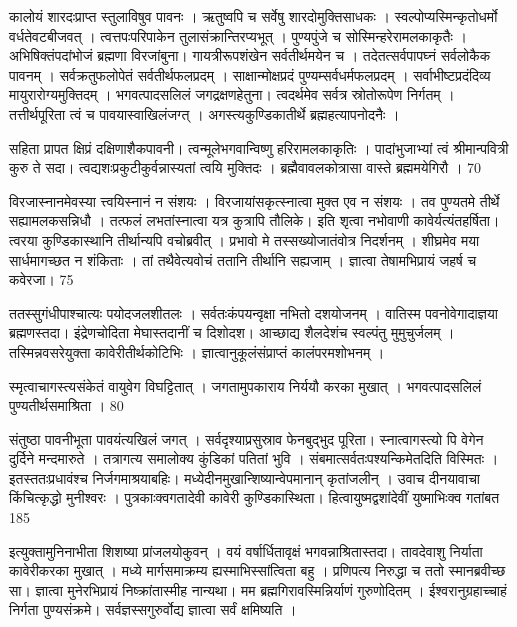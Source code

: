  कालोयं शारदःप्राप्त स्तुलाविषुव पावनः ।
 ऋतुष्वपि च सर्वेषु शारदोमुक्तिसाधकः ।
 स्वल्पोप्यस्मिन्कृतोधर्मो वर्धतेवटबीजवत् ।
 त्वत्तपःपरिपाकेन तुलासंक्रान्तिरप्यभूत् ।
 पुण्यपुंजे च सोस्मिन्हरेरामलकाकृतैः ।
 अभिषिक्तंपदांभोजं ब्रह्मणा विरजांबुना।
 गायत्रीरूपशंखेन सर्वतीर्थमयेन च ।
 तदेतत्सर्वपापघ्नं सर्वलोकैक पावनम् ।
 सर्वक्रतुफलोपेतं सर्वतीर्थफलप्रदम् ।
 साक्षान्मोक्षप्रदं पुण्यम्सर्वधर्मफलप्रदम् ।
 सर्वाभीष्टप्रदंदिव्य मायुरारोग्यमुक्तिदम् ।
 भगवत्पादसलिलं जगद्रक्षणहेतुना।
 त्वदर्थमेव सर्वत्र स्रोतोरूपेण निर्गतम् ।
 तत्तीर्थपूरिता त्वं च पावयास्वाखिलंजग्त् ।
 अगस्त्यकुण्डिकातीर्थे ब्रह्महत्यापनोदनैः ।
 
सहिता प्रापत क्षिप्रं दक्षिणाशैकपावनी।
 त्वन्मूलेभगवान्विष्णु हरिरामलकाकृतिः ।
 पादांभुजाभ्यां त्वं श्रीमान्पवित्री कुरु ते सदा।
 त्वद्यशःप्रकुटीकुर्वन्नास्यतां त्वयि मुक्तिदः ।
 ब्रह्मैवावलकोत्रासा वास्ते ब्रह्ममयेगिरौ ।
 70

  विरजास्नानमेवस्या त्त्वयिस्नानं न संशयः ।
 विरजायांसकृत्स्नात्वा मुक्त एव न संशयः ।
 तव पुण्यतमे तीर्थे सह्यामलकसन्निधौ ।
 तत्फलं लभतांस्नात्वा यत्र कुत्रापि तौलिके।
 इति शृत्वा नभोवाणी कावेर्यत्यंतहर्षिता।
 त्वरया कुण्डिकास्थानि तीर्थान्यपि वचोब्रवीत् ।
 प्रभावो मे तस्सख्योजातंवोत्र निदर्शनम् ।
 शीघ्रमेव मया सार्धमागच्छत न शंकिताः ।
 तां तथैवेत्यवोचं ततानि तीर्थानि सह्यजाम् ।
 ज्ञात्वा तेषामभिप्रायं जहर्ष च कवेरजा।
 75

  ततस्सुगंधीपाश्चात्यः पयोदजलशीतलः ।
 सर्वतःकंपयन्वृक्षा नभितो दशयोजनम् ।
 वातिस्म पवनोवेगादाज्ञया ब्रह्मणस्तदा।
 इंद्रेणचोदिता मेघास्तदानीं च दिशोदश।
 आच्छाद्य शैलदेशंच स्वल्पंतु मुमुचुर्जलम् ।
 तस्मिन्नवसरेयुक्ता कावेरीतीर्थकोटिभिः ।
 ज्ञात्वानुकूलंसंप्राप्तं कालंपरमशोभनम् ।
 
स्मृत्वाचागस्त्यसंकेतं वायुवेग विघट्टितात् ।
 जगतामुपकाराय निर्ययौ करका मुखात् ।
 भगवत्पादसलिलं पुण्यतीर्थसमाश्रिता ।
 80

  संतुष्ठा पावनीभूता पावयंत्यखिलं जगत् ।
 सर्वदृश्याप्रसुस्राव फेनबुद्भुद पूरिता।
 स्नात्वागस्त्यो पि वेगेन दुर्दिने मन्दमारुते ।
 तत्रागत्य समालोक्य कुंडिकां पतितां भुवि ।
 संबमात्सर्वतःपश्यन्किमेतदिति विस्मितः ।
 इतस्ततःप्रधावंश्च निर्जगमाश्रयाबहिः।
 मध्येदीनमुखान्शिष्यान्वेपमानान् कृतांजलीन् ।
 उवाच दीनयावाचा किंचित्कृद्धो मुनीश्वरः ।
 पुत्रकाःक्वगतादेवी कावेरी कुण्डिकास्थिता।
 हित्वायुष्मद्वशांदेवीं युष्माभिःक्व गतांबत 185

  इत्युक्तामुनिनाभीता शिशष्या प्रांजलयोकुवन् ।
 वयं वर्षार्धितावृक्षं भगवन्नाश्रितास्तदा।
 तावदेवाशु निर्याता कावेरीकरका मुखात् ।
 मध्ये मार्गसमाक्रम्य ह्यस्माभिस्सांत्विता बहु ।
 प्रणिपत्य निरुद्धा च ततो स्मानब्रवीच्छ सा।
 ज्ञात्वा मुनेरभिप्रायं निष्क्रांतास्मीह नान्यथा।
 मम ब्रह्मगिरावस्मिन्निर्याणं गुरुणोदितम् ।
 ईश्वरानुग्रहाच्चाहं निर्गता पुण्यसंक्रमे।
 सर्वज्ञस्सगुरुर्वोद्य ज्ञात्वा सर्वं क्षमिष्यति ।
 
